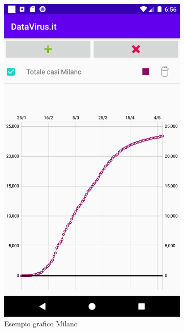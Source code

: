\documentclass{article}
\begin{document}
    \begin{figure}[h]
      \centering
      \begin{subfigure}{.5\textwidth}
        \centering
        \includegraphics[width=.8\linewidth]{milano.png}
        \caption{Esempio grafico Milano}
        \label{fig5:sub1}
      \end{subfigure}%
      \begin{subfigure}{.5\textwidth}
        \centering

\end{subfigure}
\end{figure}
\end{document}
